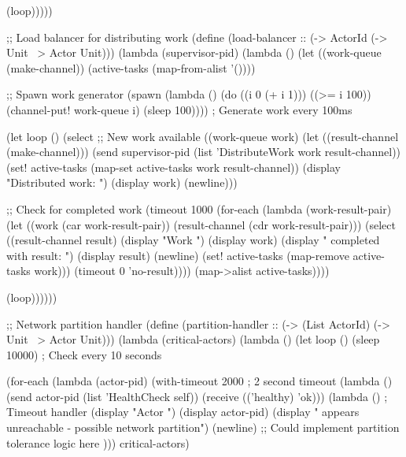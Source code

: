 \begin{example}
\begin{lambdustcode}
        (loop)))))

;; Load balancer for distributing work
(define (load-balancer :: (-> ActorId (-> Unit ~> {Actor} Unit)))
  (lambda (supervisor-pid)
    (lambda ()
      (let ((work-queue (make-channel))
            (active-tasks (map-from-alist '())))
        
        ;; Spawn work generator
        (spawn
          (lambda ()
            (do ((i 0 (+ i 1)))
                ((>= i 100))
              (channel-put! work-queue i)
              (sleep 100))))  ; Generate work every 100ms
        
        (let loop ()
          (select
            ;; New work available
            ((work-queue work)
             (let ((result-channel (make-channel)))
               (send supervisor-pid (list 'DistributeWork work result-channel))
               (set! active-tasks (map-set active-tasks work result-channel))
               (display "Distributed work: ") (display work) (newline)))
            
            ;; Check for completed work
            (timeout 1000
              (for-each
                (lambda (work-result-pair)
                  (let ((work (car work-result-pair))
                        (result-channel (cdr work-result-pair)))
                    (select
                      ((result-channel result)
                       (display "Work ") (display work) 
                       (display " completed with result: ") (display result) (newline)
                       (set! active-tasks (map-remove active-tasks work)))
                      (timeout 0 'no-result))))
                (map->alist active-tasks))))
          
          (loop))))))

;; Network partition handler
(define (partition-handler :: (-> (List ActorId) (-> Unit ~> {Actor} Unit)))
  (lambda (critical-actors)
    (lambda ()
      (let loop ()
        (sleep 10000)  ; Check every 10 seconds
        
        (for-each
          (lambda (actor-pid)
            (with-timeout 2000  ; 2 second timeout
              (lambda ()
                (send actor-pid (list 'HealthCheck self))
                (receive 
                  (('healthy) 'ok)))
              (lambda ()  ; Timeout handler
                (display "Actor ") (display actor-pid) 
                (display " appears unreachable - possible network partition") (newline)
                ;; Could implement partition tolerance logic here
                )))
          critical-actors)
        

\end{lambdustcode}
\end{example}
